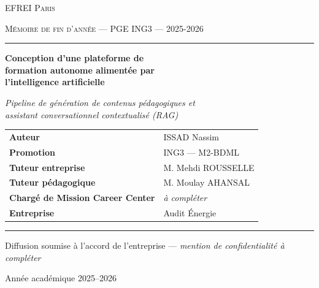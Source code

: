 \documentclass[12pt,a4paper]{article}
\begin{document}
\begin{titlepage}
\thispagestyle{empty}
\centering

{\scshape\large EFREI Paris \par}
\vspace{0.3cm}
{\scshape Mémoire de fin d'année --- PGE ING3 --- 2025-2026 \par}
\vspace{0.2cm}
\rule{\linewidth}{0.5pt}

\vfill

{\Huge\bfseries Conception d'une plateforme de\\[0.3cm]
formation autonome alimentée par\\[0.3cm]
l'intelligence artificielle \par}

\vspace{0.8cm}
{\large\itshape Pipeline de génération de contenus pédagogiques et\\
assistant conversationnel contextualisé (RAG)\par}

\vfill

\begin{tabular}{@{}ll@{}}
\textbf{Auteur} & ISSAD Nassim \\[0.3cm]
\textbf{Promotion} & ING3 --- M2-BDML \\[0.3cm]
\textbf{Tuteur entreprise} & M. Mehdi ROUSSELLE \\[0.3cm]
\textbf{Tuteur pédagogique} & M. Moulay AHANSAL \\[0.3cm]
\textbf{Chargé de Mission Career Center} & \textit{à compléter} \\[0.3cm]
\textbf{Entreprise} & Audit Énergie \\
\end{tabular}

\vfill

\rule{\linewidth}{0.5pt}
{\small Diffusion soumise à l'accord de l'entreprise --- \textit{mention de confidentialité à compléter}\par}
\vspace{0.3cm}
{\small Année académique 2025--2026\par}

\end{titlepage}

\clearpage
{}
{}

\end{document}
